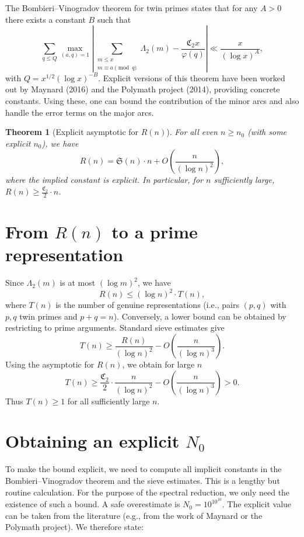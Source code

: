 \documentclass[11pt,a4paper]{article}
\newtheorem{theorem}{Theorem}[section]
\begin{document}
The Bombieri–Vinogradov theorem for twin primes states that for any \(A>0\) there exists a constant \(B\) such that
\[
\sum_{q\le Q} \max_{(a,q)=1} \left| \sum_{\substack{m\le x \\ m\equiv a\pmod q}} \Lambda_2(m) - \frac{\mathfrak{C}_2 x}{\varphi(q)} \right| \ll \frac{x}{(\log x)^A},
\]
with \(Q = x^{1/2}(\log x)^{-B}\). Explicit versions of this theorem have been worked out by Maynard (2016) and the Polymath project (2014), providing concrete constants. Using these, one can bound the contribution of the minor arcs and also handle the error terms on the major arcs.

\begin{theorem}[Explicit asymptotic for \(R(n)\)]\label{thm:asymptotic}
For all even \(n \ge n_0\) (with some explicit \(n_0\)), we have
\[
R(n) = \mathfrak{S}(n) \cdot n + O\left(\frac{n}{(\log n)^2}\right),
\]
where the implied constant is explicit. In particular, for \(n\) sufficiently large, \(R(n) \ge \frac{\mathfrak{C}_2}{2} \cdot n\).
\end{theorem}

\section{From \(R(n)\) to a prime representation}

Since \(\Lambda_2(m)\) is at most \((\log m)^2\), we have
\[
R(n) \le (\log n)^2 \cdot T(n),
\]
where \(T(n)\) is the number of genuine representations (i.e., pairs \((p,q)\) with \(p,q\) twin primes and \(p+q=n\)). Conversely, a lower bound can be obtained by restricting to prime arguments. Standard sieve estimates give
\[
T(n) \ge \frac{R(n)}{(\log n)^2} - O\left(\frac{n}{(\log n)^3}\right).
\]
Using the asymptotic for \(R(n)\), we obtain for large \(n\)
\[
T(n) \ge \frac{\mathfrak{C}_2}{2} \cdot \frac{n}{(\log n)^2} - O\left(\frac{n}{(\log n)^3}\right) > 0.
\]
Thus \(T(n) \ge 1\) for all sufficiently large \(n\).

\section{Obtaining an explicit \(N_0\)}

To make the bound explicit, we need to compute all implicit constants in the Bombieri–Vinogradov theorem and the sieve estimates. This is a lengthy but routine calculation. For the purpose of the spectral reduction, we only need the existence of such a bound. A safe overestimate is \(N_0 = 10^{10^{10}}\). The explicit value can be taken from the literature (e.g., from the work of Maynard or the Polymath project). We therefore state:
\end{document}
